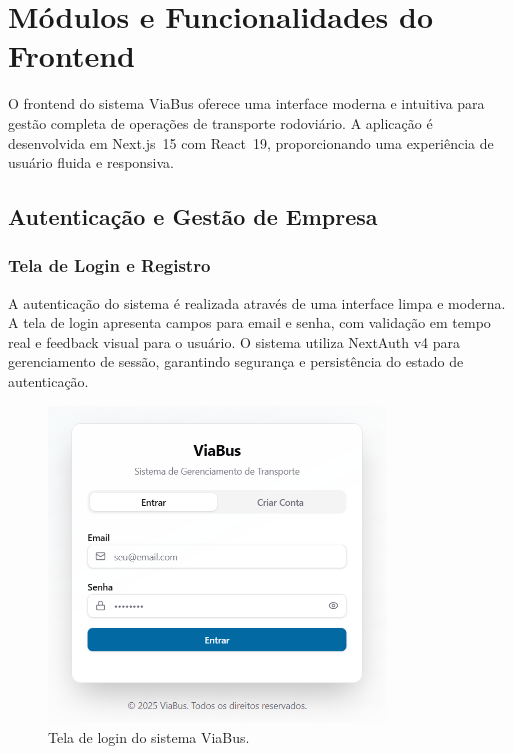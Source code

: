 \chapter{Módulos e Funcionalidades do Frontend}

O frontend do sistema ViaBus oferece uma interface moderna e intuitiva para gestão completa de operações de transporte rodoviário. A aplicação é desenvolvida em Next.js~15 com React~19, proporcionando uma experiência de usuário fluida e responsiva.

\section{Autenticação e Gestão de Empresa}

\subsection{Tela de Login e Registro}

A autenticação do sistema é realizada através de uma interface limpa e moderna. A tela de login apresenta campos para email e senha, com validação em tempo real e feedback visual para o usuário. O sistema utiliza NextAuth v4 para gerenciamento de sessão, garantindo segurança e persistência do estado de autenticação.

\begin{figure}[H]
  \centering
  \includegraphics[width=0.8\textwidth]{imagens/tela-login.png}
  \caption{Tela de login do sistema ViaBus.}
  \label{fig:tela-login}
\end{figure}

